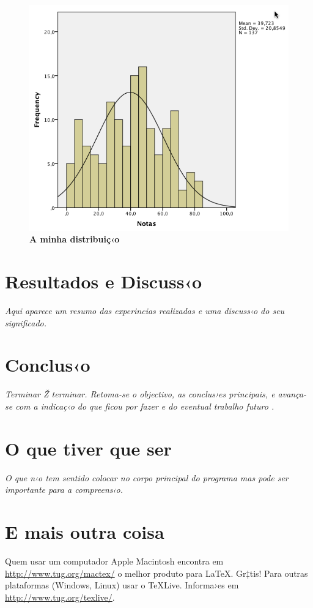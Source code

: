 \documentclass[12pt,portuguese,a4paper]{article}
\begin{document}
\begin{figure}[!htbp] %
\begin{center}
\includegraphics[scale=0.5]{imagens/dist.png}
\caption{{\bf A minha distribui\c c‹o}}
\label{fig:dist1}
\end{center}
\end{figure}

\section{Resultados e Discuss‹o}

\textit{
Aqui aparece um resumo das experincias realizadas e uma discuss‹o do seu significado.
}

\section{Conclus‹o}

\textit{
Terminar Ž terminar. Retoma-se o objectivo, as conclus›es principais, e avan\c ca-se com a indica\c c‹o do que ficou por fazer e do eventual trabalho futuro \Large{ \Smiley}.
}

\appendix

\section{O que tiver que ser}

\textit{
O que n‹o tem sentido colocar no corpo principal do programa mas pode ser importante para a compreens‹o.
}

\section{E mais outra coisa}

Quem usar um computador Apple Macintosh encontra em \url{http://www.tug.org/mactex/} o melhor produto para \LaTeX{}. Gr‡tis! Para outras plataformas (Windows, Linux) usar o TeXLive. Informa›es em \url{http://www.tug.org/texlive/}.



\end{document}
